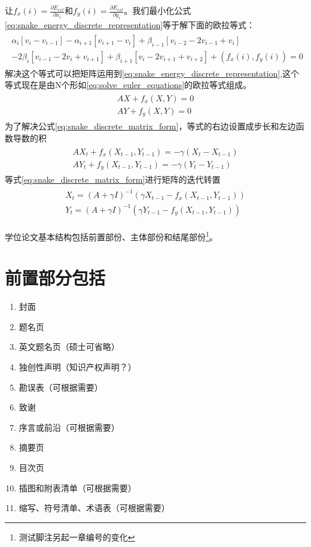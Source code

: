 让$f_{x}(i)=\frac{\partial E_{ext}}{\partial x_{i}}$和$f_{y}(i)=\frac{\partial
E_{ext}}{\partial
y_{i}}$。我们最小化公式\eqref{eq:snake_energy_discrete_representation}等于解下面的欧拉等式：
\begin{align}\label{eq:solve_euler_equations}
\begin{split}
\alpha_{i}[v_{i}-v_{i-1}] - \alpha_{i+1}[v_{i+1} -v_{i}]
+\beta_{i-1}[v_{i-2}-2v_{i-1}+v_{i}]\\
-2\beta_{i}[v_{i-1}-2v_{i}+v_{i+1}]+\beta_{i+1}[v_{i}-2v_{i+1}+v_{i+2}]+(f_{x}(i),f_{y}(i))=0
\end{split}
\end{align}
解决这个等式可以把矩阵运用到\eqref{eq:snake_energy_discrete_representation},这个等式现在是由N个形如\eqref{eq:solve_euler_equations}的欧拉等式组成。
\begin{align}\label{eq:snake_discrete_matrix_form}
\begin{split}
AX+f_{x}(X,Y)=0\\
AY+f_{y}(X,Y)=0
\end{split}
\end{align}
为了解决公式\eqref{eq:snake_discrete_matrix_form}，等式的右边设置成步长和左边函数导数的积
\begin{align}\label{eq:snake_discrete_matrix_form_solve}
\begin{split}
AX_{t}+f_{x}(X_{t-1},Y_{t-1})=-\gamma(X_{t}-X_{t-1})   \\
AY_{t}+f_{y}(X_{t-1},Y_{t-1})=-\gamma(Y_{t}-Y_{t-1})
\end{split}
\end{align}
等式\eqref{eq:snake_discrete_matrix_form}进行矩阵的迭代转置
\begin{align}\label{eq:snake_discrete_matrix_form_solve}
\begin{split}
X_{t}=(A+\gamma I)^{-1}(\gamma X_{t-1} - f_{x}(X_{t-1},Y_{t-1}))\\
Y_{t}=(A+\gamma I)^{-1}(\gamma Y_{t-1} - f_{y}(X_{t-1},Y_{t-1}))
\end{split}
\end{align}


学位论文基本结构包括前置部份、主体部份和结尾部份\footnote{测试脚注另起一章编号的变化}。
\section{前置部分包括}
\begin{enumerate}
	\item 封面
	\item 题名页
	\item 英文题名页（硕士可省略）
	\item 独创性声明（知识产权声明？）
	\item 勘误表（可根据需要）
	\item 致谢
	\item 序言或前沿（可根据需要）
	\item 摘要页
	\item 目次页
	\item 插图和附表清单（可根据需要）
	\item 缩写、符号清单、术语表（可根据需要）
\end{enumerate}
